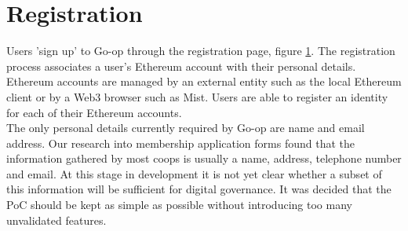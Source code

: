 \section{Registration}
\begin{figure}
\centering
{}
\decoRule
\caption[]{}
\label{fig:regpage}
\end{figure}

Users 'sign up' to Go-op through the registration page, figure \ref{fig:regpage}. The registration process associates a user's Ethereum account with their personal details. Ethereum accounts are managed by an external entity such as the local Ethereum client or by a Web3 browser such as Mist. Users are able to register an identity for each of their Ethereum accounts.\\

The only personal details currently required by Go-op are name and email address. Our research into membership application forms found that the information gathered by most coops is usually a name, address, telephone number and email. At this stage in development it is not yet clear whether a subset of this information will be sufficient for digital governance. It was decided that the PoC should be kept as simple as possible without introducing too many unvalidated features. 


